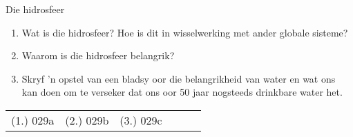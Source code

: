 \begin{eocexercises}{Die hidrosfeer}
            \nopagebreak

\begin{enumerate}[noitemsep, label=\textbf{\arabic*}. ] 
    \item Wat is die hidrosfeer? Hoe is dit in wisselwerking met ander globale sisteme?
    \item Waarom is die hidrosfeer belangrik?
    \item Skryf  'n opstel van een bladsy oor die belangrikheid van water en wat ons kan doen om te verseker dat ons oor 50 jaar nogsteeds drinkbare water het.
\end{enumerate}

\par \practiceinfo
\par \begin{tabular}[h]{cccccc}
(1.)	029a	&
(2.)	029b	&
(3.)	029c	&
\end{tabular}
\end{eocexercises}

